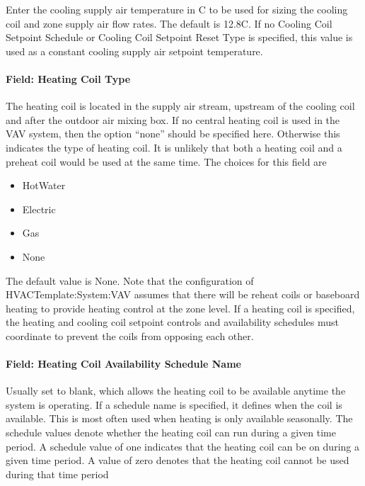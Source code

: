 Enter the cooling supply air temperature in C to be used for sizing the cooling coil and zone supply air flow rates. The default is 12.8C. If no Cooling Coil Setpoint Schedule or Cooling Coil Setpoint Reset Type is specified, this value is used as a constant cooling supply air setpoint temperature.

\paragraph{Field: Heating Coil Type}\label{field-heating-coil-type-4}

The heating coil is located in the supply air stream, upstream of the cooling coil and after the outdoor air mixing box. If no central heating coil is used in the VAV system, then the option ``none'' should be specified here. Otherwise this indicates the type of heating coil. It is unlikely that both a heating coil and a preheat coil would be used at the same time. The choices for this field are

\begin{itemize}
\item
  HotWater
\item
  Electric
\item
  Gas
\item
  None
\end{itemize}

The default value is None. Note that the configuration of HVACTemplate:System:VAV assumes that there will be reheat coils or baseboard heating to provide heating control at the zone level. If a heating coil is specified, the heating and cooling coil setpoint controls and availability schedules must coordinate to prevent the coils from opposing each other.

\paragraph{Field: Heating Coil Availability Schedule Name}\label{field-heating-coil-availability-schedule-name-4}

Usually set to blank, which allows the heating coil to be available anytime the system is operating. If a schedule name is specified, it defines when the coil is available. This is most often used when heating is only available seasonally. The schedule values denote whether the heating coil can run during a given time period. A schedule value of one indicates that the heating coil can be on during a given time period. A value of zero denotes that the heating coil cannot be used during that time period

